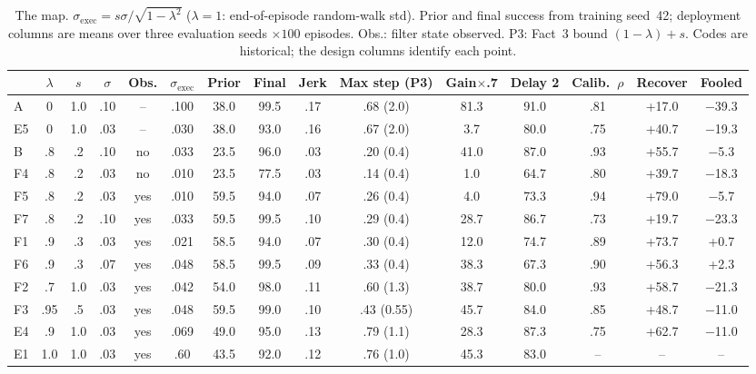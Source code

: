 \documentclass{article}
\newcommand{\sexec}{\sigma_{\mathrm{exec}}}
\begin{document}
\begin{table}[t]
\centering
\caption{The map. $\sexec=s\sigma/\sqrt{1-\lambda^2}$ ($\lambda=1$: end-of-episode random-walk std). Prior and final success from training seed~42; deployment columns are means over three evaluation seeds $\times100$ episodes. Obs.: filter state observed. P3: Fact~3 bound $(1-\lambda)+s$. Codes are historical; the design columns identify each point.}
\label{tab:points}
\small
\setlength{\tabcolsep}{3.5pt}
\begin{tabular}{l ccc c c | cc | cc | cc | ccc}
\toprule
& $\lambda$ & $s$ & $\sigma$ & Obs. & $\sexec$ & Prior & Final & Jerk & Max step (P3) & Gain$\times$.7 & Delay 2 & Calib.\ $\rho$ & Recover & Fooled \\
\midrule
A  & 0    & 1.0 & .10 & --  & .100 & 38.0 & 99.5 & .17 & .68 (2.0) & 81.3 & 91.0 & .81 & +17.0 & $-$39.3 \\
E5 & 0    & 1.0 & .03 & --  & .030 & 38.0 & 93.0 & .16 & .67 (2.0) & 3.7  & 80.0 & .75 & +40.7 & $-$19.3 \\
B  & .8   & .2  & .10 & no  & .033 & 23.5 & 96.0 & .03 & .20 (0.4) & 41.0 & 87.0 & .93 & +55.7 & $-$5.3 \\
F4 & .8   & .2  & .03 & no  & .010 & 23.5 & 77.5 & .03 & .14 (0.4) & 1.0  & 64.7 & .80 & +39.7 & $-$18.3 \\
F5 & .8   & .2  & .03 & yes & .010 & 59.5 & 94.0 & .07 & .26 (0.4) & 4.0  & 73.3 & .94 & +79.0 & $-$5.7 \\
F7 & .8   & .2  & .10 & yes & .033 & 59.5 & 99.5 & .10 & .29 (0.4) & 28.7 & 86.7 & .73 & +19.7 & $-$23.3 \\
F1 & .9   & .3  & .03 & yes & .021 & 58.5 & 94.0 & .07 & .30 (0.4) & 12.0 & 74.7 & .89 & +73.7 & +0.7 \\
F6 & .9   & .3  & .07 & yes & .048 & 58.5 & 99.5 & .09 & .33 (0.4) & 38.3 & 67.3 & .90 & +56.3 & +2.3 \\
F2 & .7   & 1.0 & .03 & yes & .042 & 54.0 & 98.0 & .11 & .60 (1.3) & 38.7 & 80.0 & .93 & +58.7 & $-$21.3 \\
F3 & .95  & .5  & .03 & yes & .048 & 59.5 & 99.0 & .10 & .43 (0.55) & 45.7 & 84.0 & .85 & +48.7 & $-$11.0 \\
E4 & .9   & 1.0 & .03 & yes & .069 & 49.0 & 95.0 & .13 & .79 (1.1) & 28.3 & 87.3 & .75 & +62.7 & $-$11.0 \\
E1 & 1.0  & 1.0 & .03 & yes & .60  & 43.5 & 92.0 & .12 & .76 (1.0) & 45.3 & 83.0 & -- & -- & -- \\
\bottomrule
\end{tabular}
\end{table}
\end{document}
